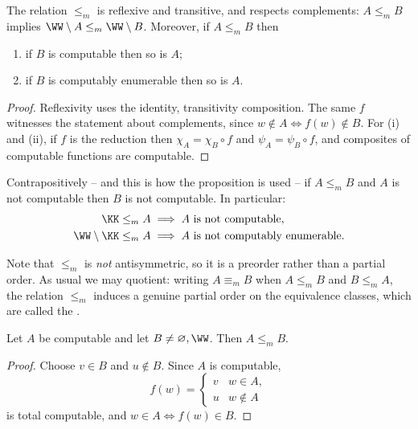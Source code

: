 \begin{proposition}\label{prop:reductionbasics}
	The relation $\leq_m$ is reflexive and transitive, and respects complements: $A \leq_m B$ implies $\WW\setminus A \leq_m \WW\setminus B$. Moreover, if $A \leq_m B$ then
	\begin{enumerate}[label=(\roman*)]
		\item if $B$ is computable then so is $A$;
		\item if $B$ is computably enumerable then so is $A$.
	\end{enumerate}
\end{proposition}

\begin{proof}
	Reflexivity uses the identity, transitivity composition. The same $f$ witnesses the statement about complements, since $w \notin A \iff f(w)\notin B$. For (i) and (ii), if $f$ is the reduction then $\chi_A = \chi_B \circ f$ and $\psi_A = \psi_B\circ f$, and composites of computable functions are computable.
\end{proof}

Contrapositively -- and this is how the proposition is used -- if $A \leq_m B$ and $A$ is not computable then $B$ is not computable. In particular:
\begin{align*}
	\KK \leq_m A &\implies A \text{ is not computable}, \\
	\WW\setminus\KK \leq_m A &\implies A \text{ is not computably enumerable}.
\end{align*}

Note that $\leq_m$ is \emph{not} antisymmetric, so it is a preorder rather than a partial order. As usual we may quotient: writing $A \equiv_m B$ when $A \leq_m B$ and $B \leq_m A$, the relation $\leq_m$ induces a genuine partial order on the equivalence classes, which are called the .

\begin{proposition}\label{prop:computablebottom}
	Let $A$ be computable and let $B \neq \varnothing, \WW$. Then $A \leq_m B$.
\end{proposition}

\begin{proof}
	Choose $v \in B$ and $u \notin B$. Since $A$ is computable,
	$$f(w) = \begin{cases} v & w \in A, \\ u & w\notin A\end{cases}$$
	is total computable, and $w \in A \iff f(w)\in B$.
\end{proof}

